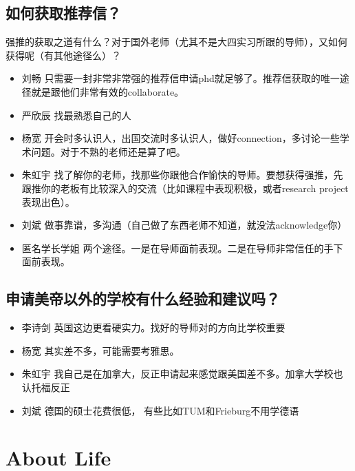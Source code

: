\documentclass{vivid_layout}
\begin{document}
\subsection{如何获取推荐信？}
强推的获取之道有什么？对于国外老师（尤其不是大四实习所跟的导师），又如何获得呢（有其他途径么）？
\begin{itemize}
\item  { 刘畅}  \quad 只需要一封非常非常强的推荐信申请phd就足够了。推荐信获取的唯一途径就是跟他们非常有效的collaborate。
\item  { 严欣辰}  \quad 找最熟悉自己的人
\item  { 杨宽}  \quad 开会时多认识人，出国交流时多认识人，做好connection，多讨论一些学术问题。对于不熟的老师还是算了吧。
\item  { 朱虹宇}  \quad 找了解你的老师，找那些你跟他合作愉快的导师。要想获得强推，先跟推你的老板有比较深入的交流（比如课程中表现积极，或者research project表现出色）。
\item  { 刘斌}  \quad 做事靠谱，多沟通（自己做了东西老师不知道，就没法acknowledge你）
\item {\name 匿名学长学姐}  \quad 两个途径。一是在导师面前表现。二是在导师非常信任的手下面前表现。
\end{itemize}

\subsection{申请美帝以外的学校有什么经验和建议吗？}
\begin{itemize}
\item  { 李诗剑}  \quad 英国这边更看硬实力。找好的导师对的方向比学校重要
\item  { 杨宽}  \quad 其实差不多，可能需要考雅思。
\item  { 朱虹宇}  \quad 我自己是在加拿大，反正申请起来感觉跟美国差不多。加拿大学校也认托福反正
\item  { 刘斌}  \quad 德国的硕士花费很低， 有些比如TUM和Frieburg不用学德语
\end{itemize}

\section{About Life}
\addtocounter{section}{1}
\setcounter{subsection}{0}
\end{document}
